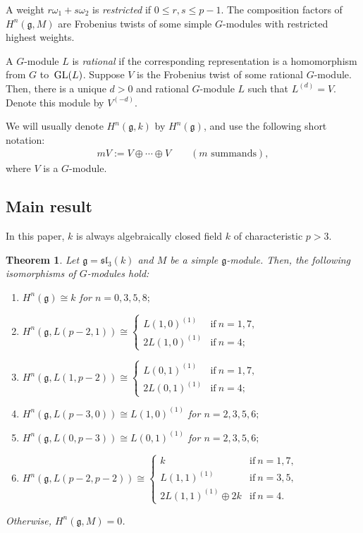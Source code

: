 \documentclass[pdftex]{sigma}%
\numberwithin{equation}{section}
\newtheorem{Theorem}{Theorem}[section]
\begin{document}
A weight $r\omega_1+s\omega_2$ is {\it restricted} if $0\leq r, s\leq p-1$. The composition factors of $H^n(\mathfrak{g},M)$ are Frobenius twists of some simple $G$-modules with restricted highest weights.

A $G$-module $L$ is {\it rational} if the corresponding representation is a homomorphism from $G$ to~${\rm GL}(L)$. Suppose $V$ is the Frobenius twist of some rational $G$-module. Then, there is a unique $d>0$ and rational $G$-module $L$ such that $L^{(d)}=V$. Denote this module by $V^{(-d)}$.

We will usually denote $H^n(\mathfrak{g},k)$ by $H^n(\mathfrak{g})$, and use the following short notation:
\begin{gather*}
mV:=V\oplus\cdots\oplus V\qquad (m\text{ summands}),
\end{gather*}
where $V$ is a $G$-module.

\subsection{Main result}

In this paper, $k$ is always algebraically closed field $k$ of characteristic
$p>3$.
\begin{Theorem}\label{th1} Let $\mathfrak{g}=\mathfrak{sl}_3(k)$ and $M$ be a simple $\mathfrak{g}$-module. Then, the following isomorphisms of $G$-modules hold:

\begin{enumerate}\itemsep=0pt
\item[$(a)$] $H^n(\mathfrak{g})\cong k$ for $n=0,3,5,8;$

\item[$(b)$] $H^n(\mathfrak{g},L(p-2,1))\cong
\begin{cases}
L(1,0)^{(1)}&\text{if}\ n=1,7,
\\
2L(1,0)^{(1)}&\text{if}\ n=4;\end{cases}$

\item[$(c)$] $H^n(\mathfrak{g},L(1,p-2))\cong
\begin{cases}
L(0,1)^{(1)}&\text{if}\ n=1,7,
\\
2L(0,1)^{(1)}&\text{if}\ n=4;
\end{cases}$

\item[$(d)$] $H^n(\mathfrak{g},L(p-3,0))\cong L(1,0)^{(1)}$ for $n=2,3,5,6;$

\item[$(e)$] $H^n(\mathfrak{g},L(0,p-3))\cong L(0,1)^{(1)}$ for $n=2,3,5,6;$

\item[$(f)$] $H^n(\mathfrak{g},L(p-2,p-2))\cong
\begin{cases}
k&\text{if}\ n=1,7,
\\
L(1,1)^{(1)}&\text{if}\ n=3,5,
\\
2L(1,1)^{(1)}\oplus 2k&\text{if}\ n=4.
\end{cases}$
\end{enumerate}
Otherwise, $H^n(\mathfrak{g},M)=0$.
\end{Theorem}
\end{document}
